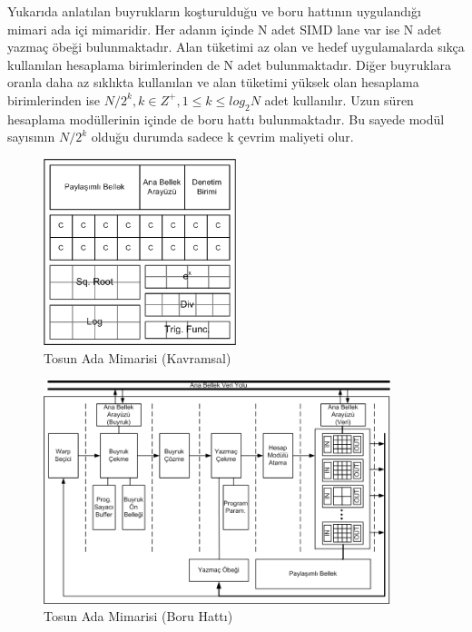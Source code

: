 Yukarıda anlatılan buyrukların koşturulduğu ve boru hattının uygulandığı mimari ada içi mimaridir. Her adanın içinde N adet SIMD lane var ise N adet yazmaç öbeği bulunmaktadır. Alan tüketimi az olan ve hedef uygulamalarda sıkça kullanılan hesaplama birimlerinden de N adet bulunmaktadır. Diğer buyruklara oranla daha az sıklıkta kullanılan ve alan tüketimi yüksek olan hesaplama birimlerinden ise $N/2^{k}, k\in Z^{+} , 1 \le k \le log_{2}N$ adet kullanılır. Uzun süren hesaplama modüllerinin içinde de boru hattı bulunmaktadır. Bu sayede modül sayısının $N/2^{k}$ olduğu durumda sadece k çevrim maliyeti olur.\par
\begin{figure}[h]
\centering
\shorthandoff{=}
\includegraphics[width=0.5\textwidth]{gorsel/adaMimarisiEski.png}
\shorthandoff{=}
\caption{Tosun Ada Mimarisi (Kavramsal)}
\label{image:adaMimarisiEski}
\end{figure}

\begin{figure}[h]
\centering
\shorthandoff{=}
\includegraphics[width=0.9\textwidth]{gorsel/adaMimarisi.png}
\shorthandoff{=}
\caption{Tosun Ada Mimarisi (Boru Hattı)}
\label{image:adaMimarisi}
\end{figure}

